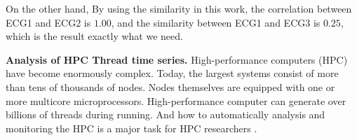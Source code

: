 On the other hand, By using the similarity in this work, the correlation between ECG1 and ECG2 is $1.00$, and the similarity between ECG1 and ECG3 is $0.25$, which is the result exactly what we need.

%







\textbf{Analysis of HPC Thread time series.}
High-performance computers (HPC) have become enormously complex. Today, the largest systems consist of more than tens of thousands of nodes. Nodes themselves are equipped with one or more multicore microprocessors\cite{adhianto2010hpctoolkit}. 
High-performance computer can generate over billions of threads during running.
And how to automatically analysis and monitoring the HPC is a major task for HPC researchers \cite{mccurdy2010memphis,tallent2009effective}.


